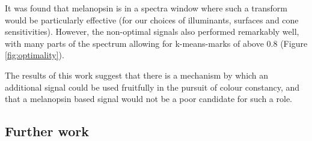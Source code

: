 It was found that melanopsin is in a spectra window where such a transform would be particularly effective (for our choices of illuminants, surfaces and cone sensitivities). However, the non-optimal signals also performed remarkably well, with many parts of the spectrum allowing for k-means-marks of above 0.8 (Figure \ref{fig:optimality}). 

The results of this work suggest that there is a mechanism by which an additional signal could be used fruitfully in the pursuit of colour constancy, and that a melanopsin based signal would not be a poor candidate for such a role.

\subsection{Further work}


